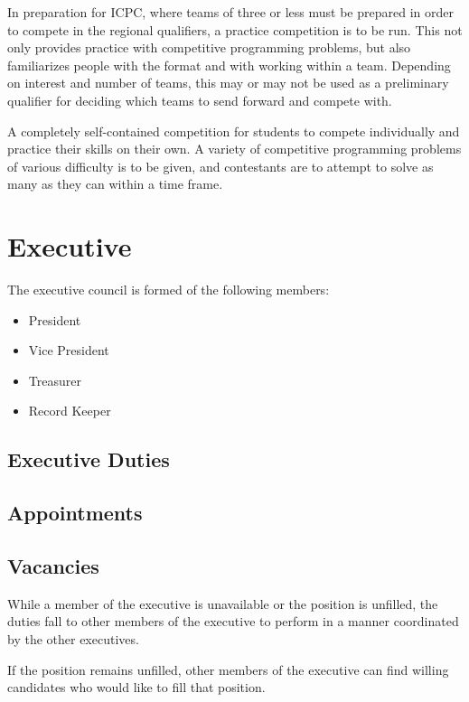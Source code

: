 \documentclass[11pt]{article}
\begin{document}
\vspace{2mm}
\noindent
In preparation for ICPC, where teams of three or less must be prepared in order to compete in the regional qualifiers, a practice competition is to be run. This not only provides practice with competitive programming problems, but also familiarizes people with the format and with working within a team. Depending on interest and number of teams, this may or may not be used as a preliminary qualifier for deciding which teams to send forward and compete with.

\vspace{2mm}
\noindent
A completely self-contained competition for students to compete individually and practice their skills on their own. A variety of competitive programming problems of various difficulty is to be given, and contestants are to attempt to solve as many as they can within a time frame.

\section{Executive}

The executive council is formed of the following members:

\begin{itemize}
  \item President
  \item Vice President
  \item Treasurer
  \item Record Keeper
\end{itemize}

\subsection{Executive Duties}

\subsection{Appointments}

\subsection{Vacancies}

While a member of the executive is unavailable or the position is unfilled, the duties fall to other members of the executive to perform in a manner coordinated by the other executives.

If the position remains unfilled, other members of the executive can find willing candidates who would like to fill that position.
\end{document}
